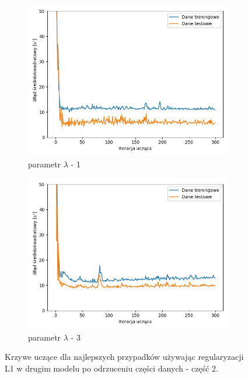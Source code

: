 \documentclass[12pt]{aghdpl}
\begin{document}
		\begin{figure}[h]
			\centering
		 	\begin{subfigure}{.8\linewidth}
		 		\includegraphics[width =\linewidth]{wykresy/7_badanie_danych/l1/regularyzacja_1_wykres_uczenia.png}
		 		\caption{parametr $\lambda$ - 1}
		 	\end{subfigure}
		 	\begin{subfigure}{.8\linewidth}
		 		\includegraphics[width =\linewidth]{wykresy/7_badanie_danych/l1/regularyzacja_3_wykres_uczenia.png}
		 		\caption{parametr $\lambda$ - 3}
		 	\end{subfigure}
		  	
		  	\caption{Krzywe uczące dla najlepszych przypadków używając regularyzacji L1 w drugim modelu po odrzuceniu części danych - część 2.}
			\label{fig: drugi_model_przy_regularyzacji_l1_po_odrzuceniu_czesci_danych_wykresy_uczenia_2}
		\end{figure}
		 	
\end{document}
